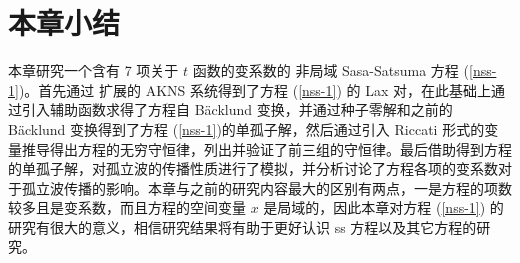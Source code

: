 \section{本章小结}
本章研究一个含有 7 项关于 $t$ 函数的变系数的 非局域 Sasa-Satsuma 方程 (\ref{nss-1})。首先通过 扩展的 AKNS 系统得到了方程 (\ref{nss-1}) 的 Lax 对，在此基础上通过引入辅助函数求得了方程自 B\"{a}cklund 变换，并通过种子零解和之前的 B\"{a}cklund 变换得到了方程 (\ref{nss-1})的单孤子解，然后通过引入 Riccati 形式的变量推导得出方程的无穷守恒律，列出并验证了前三组的守恒律。最后借助得到方程的单孤子解，对孤立波的传播性质进行了模拟，并分析讨论了方程各项的变系数对于孤立波传播的影响。本章与之前的研究内容最大的区别有两点，一是方程的项数较多且是变系数，而且方程的空间变量 $x$ 是局域的，因此本章对方程 (\ref{nss-1}) 的研究有很大的意义，相信研究结果将有助于更好认识 ss 方程以及其它方程的研究。
